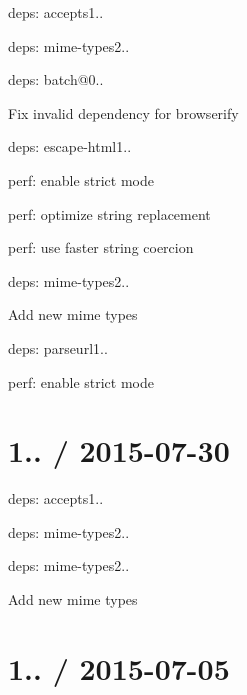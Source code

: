 \begin{DoxyItemize}
\item deps\+: accepts1..
\begin{DoxyItemize}
\item deps\+: mime-\/types2..
\end{DoxyItemize}
\item deps\+: batch@0..
\begin{DoxyItemize}
\item Fix invalid dependency for browserify
\end{DoxyItemize}
\item deps\+: escape-\/html1..
\begin{DoxyItemize}
\item perf\+: enable strict mode
\item perf\+: optimize string replacement
\item perf\+: use faster string coercion
\end{DoxyItemize}
\item deps\+: mime-\/types2..
\begin{DoxyItemize}
\item Add new mime types
\end{DoxyItemize}
\item deps\+: parseurl1..
\begin{DoxyItemize}
\item perf\+: enable strict mode
\end{DoxyItemize}
\end{DoxyItemize}

\section*{1.. / 2015-\/07-\/30 }


\begin{DoxyItemize}
\item deps\+: accepts1..
\begin{DoxyItemize}
\item deps\+: mime-\/types2..
\end{DoxyItemize}
\item deps\+: mime-\/types2..
\begin{DoxyItemize}
\item Add new mime types
\end{DoxyItemize}
\end{DoxyItemize}

\section*{1.. / 2015-\/07-\/05 }


